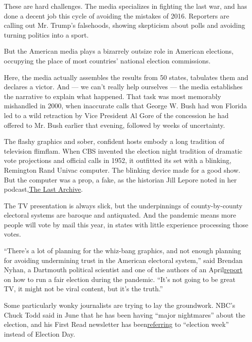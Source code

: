 These are hard challenges. The media specializes in fighting the last
war, and has done a decent job this cycle of avoiding the mistakes of
2016. Reporters are calling out Mr. Trump's falsehoods, showing
skepticism about polls and avoiding turning politics into a sport.

But the American media plays a bizarrely outsize role in American
elections, occupying the place of most countries' national election
commissions.

Here, the media actually assembles the results from 50 states, tabulates
them and declares a victor. And --- we can't really help ourselves ---
the media establishes the narrative to explain what happened. That task
was most memorably mishandled in 2000, when inaccurate calls that George
W. Bush had won Florida led to a wild retraction by Vice President Al
Gore of the concession he had offered to Mr. Bush earlier that evening,
followed by weeks of uncertainty.

The flashy graphics and sober, confident hosts embody a long tradition
of television flimflam. When CBS invented the election night tradition
of dramatic vote projections and official calls in 1952, it outfitted
its set with a blinking, Remington Rand Univac computer. The blinking
device made for a good show. But the computer was a prop, a fake, as the
historian Jill Lepore noted in her
podcast,\href{https://www.thelastarchive.com/}{The Last Archive}.

The TV presentation is always slick, but the underpinnings of
county-by-county electoral systems are baroque and antiquated. And the
pandemic means more people will vote by mail this year, in states with
little experience processing those votes.

``There's a lot of planning for the whiz-bang graphics, and not enough
planning for avoiding undermining trust in the American electoral
system,'' said Brendan Nyhan, a Dartmouth political scientist and one of
the authors of an
April\href{https://www.law.uci.edu/faculty/full-time/hasen/2020ElectionReport.pdf}{report}
on how to run a fair election during the pandemic. ``It's not going to
be great TV, it might not be viral content, but it's the truth.''

Some particularly wonky journalists are trying to lay the groundwork.
NBC's Chuck Todd said in June that he has been having ``major
nightmares'' about the election, and his First Read newsletter has
been\href{https://www.nbcnews.com/politics/meet-the-press/say-goodbye-election-night-hello-election-week-n1228206}{referring}
to ``election week'' instead of Election Day.

